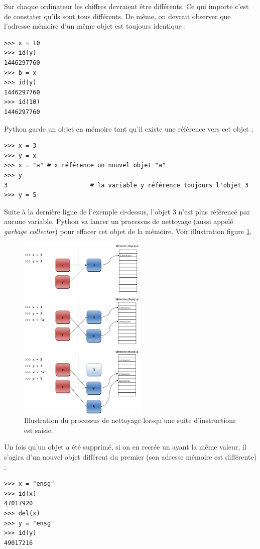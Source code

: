 \documentclass[12pt, a4paper]{article}
\begin{document}
Sur chaque ordinateur les chiffres devraient être différents. Ce qui importe c'est de constater qu'ils sont tous différents. De même, on devrait observer que l'adresse mémoire d'un même objet est toujours identique :
\begin{lstlisting}
>>> x = 10
>>> id(y)
1446297760
>>> b = x
>>> id(y)
1446297760
>>> id(10)
1446297760
\end{lstlisting}

Python garde un objet en mémoire tant qu’il existe une référence vers cet objet :
\begin{lstlisting}
>>> x = 3
>>> y = x
>>> x = "a"	# x référence un nouvel objet "a"
>>> y
3						# la variable y référence toujours l'objet 3
>>> y = 5
\end{lstlisting}

Suite à la dernière ligne de l'exemple ci-dessus, l'objet 3 n'est plus référencé par aucune variable. Python va lancer un processus de nettoyage (aussi appelé \textit{garbage collector}) pour effacer cet objet de la mémoire. Voir illustration figure \ref{fig:garbage_collector}.

\begin{figure}
	\center \includegraphics[width=0.55\textwidth]{img/garbage_collector.png}
	\caption{Illustration du processus de nettoyage lorsqu'une suite d'instructions est saisie.}
	\label{fig:garbage_collector}
\end{figure}

Un fois qu'un objet a été supprimé, si on en recrée un ayant la même valeur, il s’agira d'un nouvel objet différent du premier (son adresse mémoire est différente) :
\begin{lstlisting}
>>> x = "ensg"
>>> id(x)
47017920
>>> del(x)
>>> y = "ensg"
>>> id(y)
49017216
\end{lstlisting}
\end{document}
